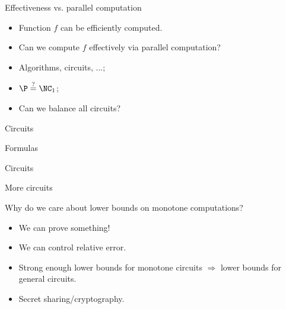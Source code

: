 \begin{frame}{Effectiveness vs. parallel computation}

    \begin{itemize}
        \item Function $f$ can be efficiently computed.
        \item Can we compute $f$ effectively via parallel computation?
    \end{itemize}

    \vspace{1cm}
    \pause

    \begin{itemize}
        \item Algorithms, circuits, ...;
            \pause
        \item $\P \stackrel{\tiny ?}{=} \NC_1$;
            \pause
        \item Can we balance all circuits?
    \end{itemize}
\end{frame}


\begin{frame}{Circuits}

        \begin{minipage}{0.33\linewidth}
        \centering
        Formulas
        \vspace{0.2cm}
        
        
    \end{minipage}
    \begin{minipage}{0.33\linewidth}
        \centering
        Circuits
        \vspace{0.2cm}
        
        
    \end{minipage}
    \begin{minipage}{0.32\linewidth}
        \centering
        More circuits
        \vspace{0.2cm}
        
        
    \end{minipage}

    \pause

    \vspace{0.5cm}
    
    Why do we care about lower bounds on monotone computations?
    \begin{itemize}
        \item We can prove something!
            \pause
        \item We can control relative error.
            \pause
        \item Strong enough lower bounds for monotone circuits
            $\Rightarrow$ lower bounds for general circuits.
            \pause
        \item Secret sharing/cryptography.
    \end{itemize}
    
\end{frame}



